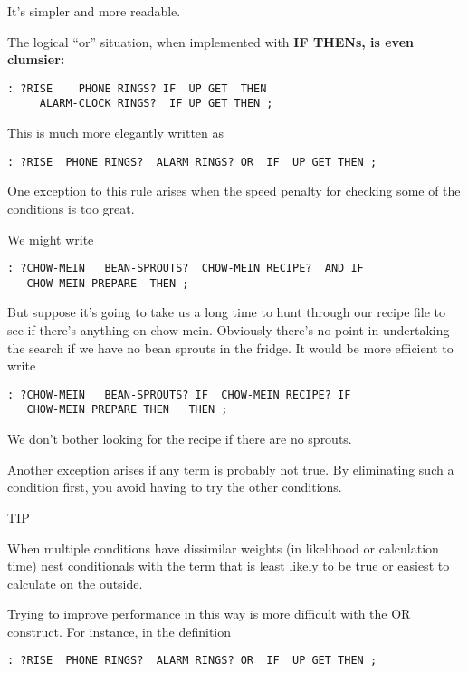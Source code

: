 It's simpler and more readable.

The logical ``or'' situation, when implemented with \bf{IF THEN}s, is
even clumsier:

\begin{verbatim}
: ?RISE    PHONE RINGS? IF  UP GET  THEN
     ALARM-CLOCK RINGS?  IF UP GET THEN ;
\end{verbatim}

This is much more elegantly written as

\begin{verbatim}
: ?RISE  PHONE RINGS?  ALARM RINGS? OR  IF  UP GET THEN ;
\end{verbatim}

One exception to this rule arises when the speed penalty for checking
some of the conditions is too great.

We might write

\begin{verbatim}
: ?CHOW-MEIN   BEAN-SPROUTS?  CHOW-MEIN RECIPE?  AND IF
   CHOW-MEIN PREPARE  THEN ;
\end{verbatim}

But suppose it's going to take us a long time to hunt through our recipe
file to see if there's anything on chow mein. Obviously there's no point in
undertaking the search if we have no bean sprouts in the fridge. It would
be more efficient to write

\begin{verbatim}
: ?CHOW-MEIN   BEAN-SPROUTS? IF  CHOW-MEIN RECIPE? IF
   CHOW-MEIN PREPARE THEN   THEN ;
\end{verbatim}

We don't bother looking for the recipe if there are no sprouts.

Another exception arises if any term is probably not true. By
eliminating such a condition first, you avoid having to try the other
conditions.

TIP

When multiple conditions have dissimilar weights (in likelihood or
calculation time) nest conditionals with the term that is least likely
to be true or easiest to calculate on the outside.

Trying to improve performance in this way is more difficult with the OR
construct. For instance, in the definition

\begin{verbatim}
: ?RISE  PHONE RINGS?  ALARM RINGS? OR  IF  UP GET THEN ;
\end{verbatim}

